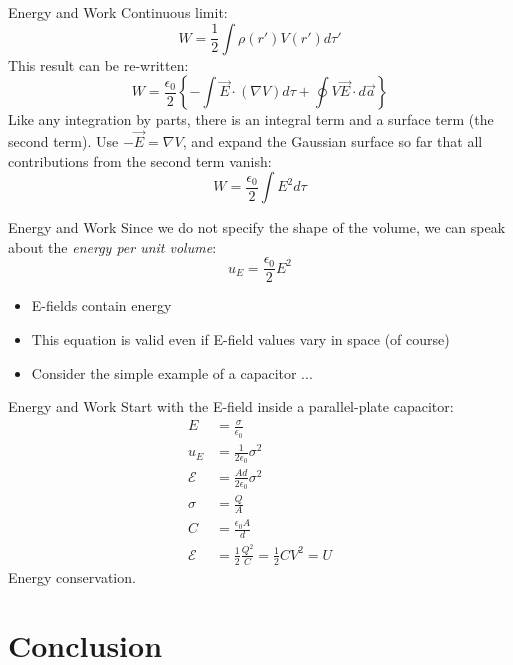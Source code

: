 \documentclass{beamer}
\begin{document}
\begin{frame}{Energy and Work}
Continuous limit:
\begin{equation}
\boxed{
W = \frac{1}{2} \int \rho(r') V(r') d\tau'
}
\end{equation}
This result can be re-written:
\begin{equation}
W = \frac{\epsilon_0}{2} \left\lbrace -\int \vec{E} \cdot (\nabla V) d\tau + \oint V \vec{E} \cdot d\vec{a} \right \rbrace
\end{equation}
Like any integration by parts, there is an integral term and a surface term (the second term).  Use $-\vec{E} = \nabla V$, and expand the Gaussian surface so far that all contributions from the second term vanish:
\begin{equation}
W = \frac{\epsilon_0}{2} \int E^2 d\tau
\end{equation}
\end{frame}

\begin{frame}{Energy and Work}
Since we do not specify the shape of the volume, we can speak about the \textit{energy per unit volume}:
\begin{equation}
\boxed{
u_E = \frac{\epsilon_0}{2}E^2
}
\end{equation}
\begin{itemize}
\item E-fields contain energy
\item This equation is valid even if E-field values vary in space (of course)
\item Consider the simple example of a capacitor ...
\end{itemize}
\end{frame}

\begin{frame}{Energy and Work}
Start with the E-field inside a parallel-plate capacitor:
\begin{align}
E &= \frac{\sigma}{\epsilon_0} \\
u_E &= \frac{1}{2\epsilon_0}\sigma^2 \\
\mathcal{E} &= \frac{Ad}{2\epsilon_0}\sigma^2 \\
\sigma &= \frac{Q}{A} \\
C &= \frac{\epsilon_0 A}{d} \\
\mathcal{E} &= \frac{1}{2} \frac{Q^2}{C} = \frac{1}{2}C V^2 = U
\end{align}
Energy conservation.
\end{frame}

\section{Conclusion}
\end{document}
